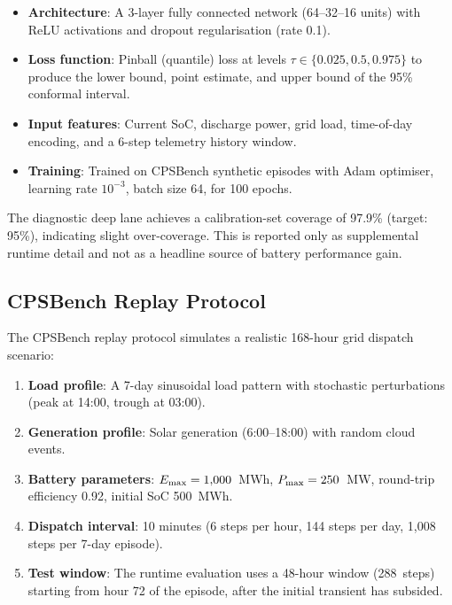 \begin{itemize}[nosep]
  \item \textbf{Architecture}: A 3-layer fully connected network (64--32--16 units)
        with ReLU activations and dropout regularisation (rate 0.1).
  \item \textbf{Loss function}: Pinball (quantile) loss at levels
        $\tau \in \{0.025, 0.5, 0.975\}$ to produce the lower bound, point
        estimate, and upper bound of the 95\% conformal interval.
  \item \textbf{Input features}: Current SoC, discharge power, grid load, time-of-day
        encoding, and a 6-step telemetry history window.
  \item \textbf{Training}: Trained on CPSBench synthetic episodes with Adam
        optimiser, learning rate $10^{-3}$, batch size 64, for 100 epochs.
\end{itemize}

The diagnostic deep lane achieves a calibration-set coverage of 97.9\% (target:
95\%), indicating slight over-coverage.  This is reported only as supplemental
runtime detail and not as a headline source of battery performance gain.

\subsection{CPSBench Replay Protocol}

The CPSBench replay protocol simulates a realistic 168-hour grid dispatch scenario:

\begin{enumerate}[nosep]
  \item \textbf{Load profile}: A 7-day sinusoidal load pattern with stochastic
        perturbations (peak at 14:00, trough at 03:00).
  \item \textbf{Generation profile}: Solar generation (6:00--18:00) with random
        cloud events.
  \item \textbf{Battery parameters}: $E_{\max} = 1{,}000$~MWh, $P_{\max} = 250$~MW,
        round-trip efficiency 0.92, initial SoC 500~MWh.
  \item \textbf{Dispatch interval}: 10 minutes (6 steps per hour, 144 steps per
        day, 1{,}008 steps per 7-day episode).
  \item \textbf{Test window}: The runtime evaluation uses a 48-hour window
        (288~steps) starting from hour 72 of the episode, after the initial
        transient has subsided.
\end{enumerate}

